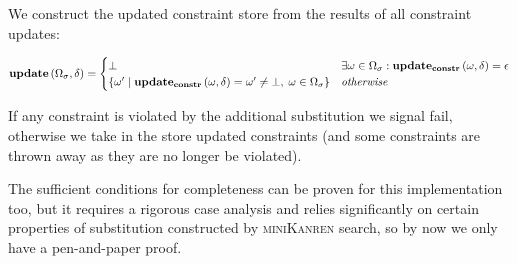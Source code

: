 We construct the updated constraint store from the results of all constraint updates:

\[
\mathbf{update}\,(\Omega_\sigma, \delta) =
\begin{cases}
  \bot                                                 & \exists \omega \in \Omega_\sigma: \mathbf{update_{constr}}\,(\omega, \delta) = \epsilon \\
  \{ \omega' \mid \mathbf{update_{constr}}\,(\omega, \delta) = \omega' \neq \bot, \; \omega \in \Omega_\sigma \}   & \textit{otherwise}
\end{cases}
\]

If any constraint is violated by the additional substitution we signal fail, otherwise we take in the store updated constraints
(and some constraints are thrown away as they are no longer be violated).

The sufficient conditions for completeness can be proven for this implementation too, but it requires a rigorous case analysis
and relies significantly on certain properties of substitution constructed by \textsc{miniKanren} search, so by now we only have a pen-and-paper proof.
